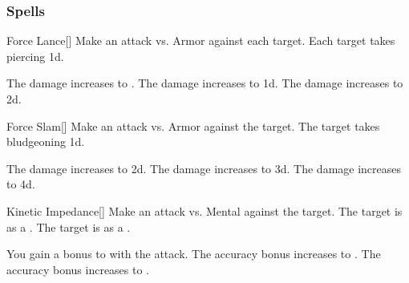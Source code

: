 \subsubsection{Spells}


\lowercase{\hypertarget{spell:Force Lance}{}}\label{spell:Force Lance}
\begin{freeability}[Rank 1]{\hypertarget{spell:Force Lance}{Force Lance}}[]
Make an attack vs. Armor against each target.
\hit Each target takes piercing  \minus1d.

\rankline
{} The damage increases to .
 The damage increases to  \plus1d.
 The damage increases to  \plus2d.
\end{freeability}
\vspace{0.25em}



\lowercase{\hypertarget{spell:Force Slam}{}}\label{spell:Force Slam}
\begin{freeability}[Rank 1]{\hypertarget{spell:Force Slam}{Force Slam}}[]
Make an attack vs. Armor against the target.
\hit The target takes bludgeoning  \plus1d.

\rankline
{} The damage increases to  \plus2d.
 The damage increases to  \plus3d.
 The damage increases to  \plus4d.
\end{freeability}
\vspace{0.25em}



\lowercase{\hypertarget{spell:Kinetic Impedance}{}}\label{spell:Kinetic Impedance}
\begin{freeability}[Rank 1]{\hypertarget{spell:Kinetic Impedance}{Kinetic Impedance}}[]
Make an attack vs. Mental against the target.
\hit The target is  as a .
\crit The target is  as a .

\rankline
{} You gain a  bonus to  with the attack.
 The accuracy bonus increases to .
 The accuracy bonus increases to .
\end{freeability}
\vspace{0.25em}



